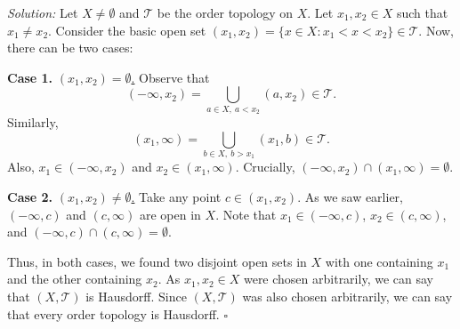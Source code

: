 
\emph{Solution:} Let $X\neq\emptyset$ and $\mathscr{T}$ be the order topology on $X$. Let
$x_1,x_2\in X$ such that $x_1\neq x_2$. Consider the basic open set
$(x_1,x_2)=\{x\in X : x_1<x<x_2\}\in\mathscr{T}$. Now, there can be two cases:

\textbf{Case 1.} \underline{$(x_1,x_2)=\emptyset$.} Observe that
\[ (-\infty,x_2)=\bigcup_{a\in X,\ a<x_2}(a,x_2)\in\mathscr{T}. \]
Similarly,
\[ (x_1,\infty)=\bigcup_{b\in X,\ b>x_1}(x_1,b)\in\mathscr{T}. \]
Also, $x_1\in(-\infty,x_2)$ and $x_2\in(x_1,\infty)$. Crucially,
$(-\infty,x_2)\cap(x_1,\infty)=\emptyset$.

\textbf{Case 2.} \underline{$(x_1,x_2)\neq\emptyset$.} Take any point $c\in(x_1,x_2)$. As we saw
earlier, $(-\infty,c)$ and $(c,\infty)$ are open in $X$. Note that $x_1\in(-\infty,c)$,
$x_2\in(c,\infty)$, and $(-\infty,c)\cap(c,\infty)=\emptyset$.

Thus, in both cases, we found two disjoint open sets in $X$ with one containing $x_1$ and the
other containing $x_2$. As $x_1,x_2\in X$ were chosen arbitrarily, we can say that
$(X,\mathscr{T})$ is Hausdorff. Since $(X,\mathscr{T})$ was also chosen arbitrarily, we can say
that every order topology is Hausdorff. \hfill$\square$
